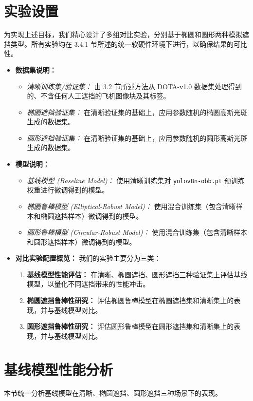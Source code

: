 \documentclass[12pt, a4paper]{report}
\begin{document}
\section{实验设置}
为实现上述目标，我们精心设计了多组对比实验，分别基于椭圆和圆形两种模拟遮挡类型。所有实验均在 3.4.1 节所述的统一软硬件环境下进行，以确保结果的可比性。
\begin{itemize}
    \item \textbf{数据集说明：}
    \begin{itemize}
        \item \textit{清晰训练集/验证集：} 由 3.2 节所述方法从 DOTA-v1.0 数据集处理得到的、不含任何人工遮挡的飞机图像块及其标签。
        \item \textit{椭圆遮挡验证集：} 在清晰验证集的基础上，应用参数随机的椭圆高斯光斑生成的数据集。
        \item \textit{圆形遮挡验证集：} 在清晰验证集的基础上，应用参数随机的圆形高斯光斑生成的数据集。
    \end{itemize}
    \item \textbf{模型说明：}
    \begin{itemize}
        \item \textit{基线模型 (Baseline Model)：} 使用清晰训练集对 \texttt{yolov8n-obb.pt} 预训练权重进行微调得到的模型。
        \item \textit{椭圆鲁棒模型 (Elliptical-Robust Model)：} 使用混合训练集（包含清晰样本和椭圆遮挡样本）微调得到的模型。
        \item \textit{圆形鲁棒模型 (Circular-Robust Model)：} 使用混合训练集（包含清晰样本和圆形遮挡样本）微调得到的模型。
    \end{itemize}
    \item \textbf{对比实验配置概览：}
    我们的实验主要分为三类：
    \begin{enumerate}
        \item \textbf{基线模型性能评估：} 在清晰、椭圆遮挡、圆形遮挡三种验证集上评估基线模型，以量化不同遮挡带来的性能冲击。
        \item \textbf{椭圆遮挡鲁棒性研究：} 评估椭圆鲁棒模型在椭圆遮挡集和清晰集上的表现，并与基线模型对比。
        \item \textbf{圆形遮挡鲁棒性研究：} 评估圆形鲁棒模型在圆形遮挡集和清晰集上的表现，并与基线模型对比。
    \end{enumerate}
\end{itemize}

\section{基线模型性能分析}
本节统一分析基线模型在清晰、椭圆遮挡、圆形遮挡三种场景下的表现。
\end{document}
